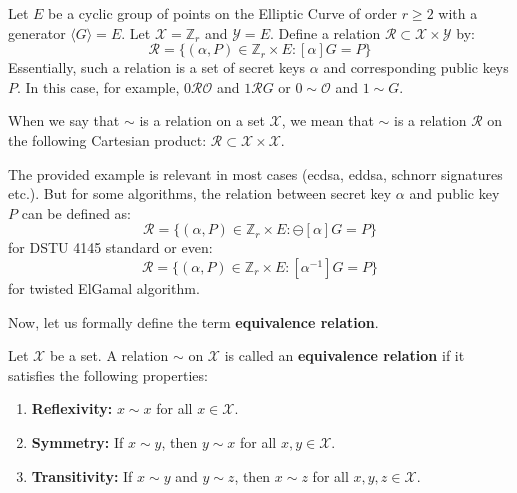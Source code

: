 \documentclass[../lecture-notes.tex]{subfiles}
\begin{document}
\begin{example}
    Let $E$ be a cyclic group of points on the Elliptic Curve of order $r \geq 2$ with a generator $\langle G \rangle = E$. Let $\mathcal{X} = \mathbb{Z}_r$ and $\mathcal{Y} = E$. Define a relation $\mathcal{R} \subset \mathcal{X} \times \mathcal{Y}$ by:
    \begin{equation*}
        \mathcal{R} = \{(\alpha, P) \in \mathbb{Z}_r \times E: [\alpha]G = P\}
    \end{equation*}
    Essentially, such a relation is a set of secret keys $\alpha$ and corresponding public keys $P$. In this case, for example, $0\mathcal{R}\mathcal{O}$ and $1\mathcal{R}G$ or $0 \sim \mathcal{O}$ and $1 \sim G$.
\end{example}

\begin{remark}
    When we say that $\sim$ is a relation on a set $\mathcal{X}$, we mean that $\sim$ is a relation $\mathcal{R}$ on the following Cartesian product: $\mathcal{R} \subset \mathcal{X} \times \mathcal{X}$.
\end{remark}

\begin{remark}
    The provided example is relevant in most cases (ecdsa, eddsa, schnorr signatures etc.). But for some algorithms, the relation between secret key $\alpha$ and public key $P$ can be defined as:
    \begin{equation*}
        \mathcal{R} = \{(\alpha, P) \in \mathbb{Z}_r \times E: \ominus[\alpha]G = P\}
    \end{equation*} 
    for DSTU 4145 standard or even:
    \begin{equation*}
        \mathcal{R} = \{(\alpha, P) \in \mathbb{Z}_r \times E: [\alpha^{-1}]G = P\}
    \end{equation*}
    for twisted ElGamal algorithm.
\end{remark}

Now, let us formally define the term \textbf{equivalence relation}.

\begin{definition}
    Let $\mathcal{X}$ be a set. A relation $\sim$ on $\mathcal{X}$ is called an \textbf{equivalence relation} if it satisfies the following properties:
    \begin{enumerate}
        \item \textbf{Reflexivity:} $x \sim x$ for all $x \in \mathcal{X}$.
        \item \textbf{Symmetry:} If $x \sim y$, then $y \sim x$ for all $x,y \in \mathcal{X}$.
        \item \textbf{Transitivity:} If $x \sim y$ and $y \sim z$, then $x \sim z$ for all $x,y,z \in \mathcal{X}$.
    \end{enumerate}
\end{definition}
\end{document}
